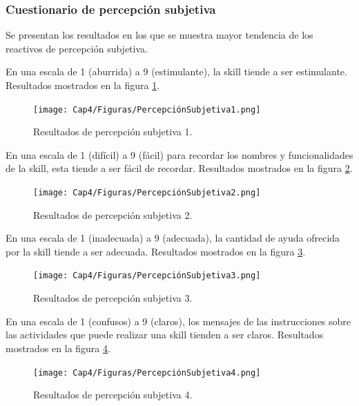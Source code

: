 
\subsubsection{Cuestionario de percepción subjetiva}
\label{CuestionarioPercepcionSubjetivacapIV}

Se presentan los resultados en los que se muestra mayor tendencia de los reactivos de percepción subjetiva.

En una escala de 1 (aburrida) a 9 (estimulante), la skill tiende a ser estimulante. Resultados mostrados en la figura \ref{fig:426}.

\begin{figure}
  \centering
  \texttt{[image: Cap4/Figuras/PercepciónSubjetiva1.png]}
  \caption{Resultados de percepción subjetiva 1.}
  \label{fig:426}
\end{figure}

En una escala de 1 (difícil) a 9 (fácil) para recordar los nombres y funcionalidades de la skill, esta tiende a ser fácil de recordar. Resultados mostrados en la figura \ref{fig:427}.

\begin{figure}
  \centering
  \texttt{[image: Cap4/Figuras/PercepciónSubjetiva2.png]}
  \caption{Resultados de percepción subjetiva 2.}
  \label{fig:427}
\end{figure}

En una escala de 1 (inadecuada) a 9 (adecuada), la cantidad de ayuda ofrecida por la skill tiende a ser adecuada. Resultados mostrados en la figura \ref{fig:428}.

\begin{figure}
  \centering
  \texttt{[image: Cap4/Figuras/PercepciónSubjetiva3.png]}
  \caption{Resultados de percepción subjetiva 3.}
  \label{fig:428}
\end{figure}

En una escala de 1 (confusos) a 9 (claros), los mensajes de las instrucciones sobre las actividades que puede realizar una skill tienden a ser claros. Resultados mostrados en la figura \ref{fig:429}.

\begin{figure}
  \centering
  \texttt{[image: Cap4/Figuras/PercepciónSubjetiva4.png]}
  \caption{Resultados de percepción subjetiva 4.}
  \label{fig:429}
\end{figure}

